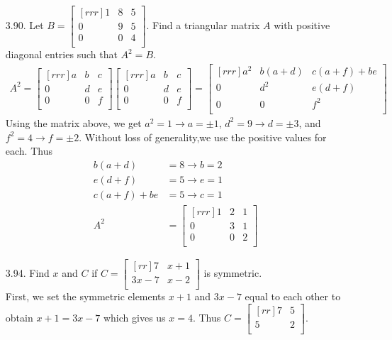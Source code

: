 \documentclass[12pt]{article}
\begin{document}
\begin{enumerate}
\item [3.90.] Let $B= \begin{bmatrix}[rrr] 1 & 8 & 5\\ 0 & 9 & 5\\ 0 & 0 & 4\\ \end{bmatrix}$. Find a triangular matrix $A$ with positive diagonal entries such that $A^2=B$.\\
	\begin{align*}
	A^2 =
	\begin{bmatrix}[rrr] a & b & c\\ 0 & d & e\\ 0 & 0 & f\\ \end{bmatrix}
	\begin{bmatrix}[rrr] a & b & c\\ 0 & d & e\\ 0 & 0 & f\\ \end{bmatrix}
	=
	\begin{bmatrix}[rrr] 
	a^2 & b(a+d) & c(a+f)+be\\ 
	0 & d^2 & e(d+f)\\ 
	0 & 0 & f^2\\ \end{bmatrix} 
	\end{align*}
	Using the matrix above, we get $a^2=1 \rightarrow a=\pm 1$, $d^2=9 \rightarrow d=\pm 3$, and $f^2=4 \rightarrow f=\pm 2$. Without loss of generality,we use the positive values for each. Thus 
	\begin{align*}
	b(a+d)&=8 \rightarrow b=2\\
	e(d+f)&=5 \rightarrow e=1\\
	c(a+f)+be&=5 \rightarrow c=1\\
	A^2 &= \begin{bmatrix}[rrr] 1 & 2 & 1\\ 0 & 3 & 1\\ 0 & 0 & 2\\ \end{bmatrix}
	\end{align*}
	
	
\item [3.94.] Find $x$ and $C$ if $C= \begin{bmatrix}[rr] 7 & x+1\\ 3x-7 & x-2\\ \end{bmatrix}$ is symmetric.\\
	First, we set the symmetric elements $x+1$ and $3x-7$ equal to each other to obtain $x+1=3x-7$ which gives us $x=4$. Thus $C= \begin{bmatrix}[rr] 7 & 5\\ 5 & 2\\ \end{bmatrix}$.


\end{enumerate}
\end{document}
